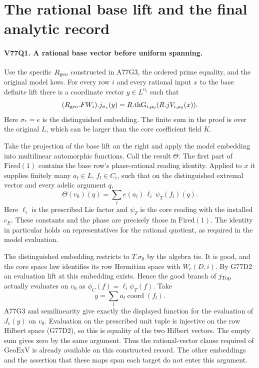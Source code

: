 \section{The rational base lift and the final analytic record}

\paragraph{V77Q1. A rational base vector before uniform spanning.}
Use the specific $R_{\rm geo}$ constructed in A77G3, the ordered
prime equality, and the original model laws. For every row $i$ and
every rational input $x$ to the base definite lift there is a
coordinate vector $y\in L^{n_i}$ such that
\[
 (R_{\rm geo}.FW_i).j_{\sigma_*}(y)
   =R.\mathrm{thG}_{i,\mu_0}(R.jV_{i,\mu_0}(x)).
\]
Here $\sigma_*=e$ is the distinguished embedding. The finite sum
in the proof is over the original $L$, which can be larger than the
core coefficient field $K$.

Take the projection of the base lift on the right and apply the
model embedding into multilinear automorphic functions. Call the
result $\Theta$. The first part of $\mathrm{Fired}(1)$ contains
the base row's phase-rational reading identity. Applied to $x$
it supplies finitely many $a_l\in L$, $f_l\in C_i$, such that
on the distinguished extremal vector and every adelic argument $q$,
\[
 \Theta(v_0)(q)=
    \sum_l e(a_l)\,\ell_i\,\psi_T(f_l)(q).
\]
Here $\ell_i$ is the prescribed Lie factor and $\psi_T$ is the
core reading with the installed $c_E$. These constants and the
phase are precisely those in $\mathrm{Fired}(1)$. The identity in particular holds on representatives for the rational
quotient, as required in the model evaluation.

The distinguished embedding restricts to $T.\sigma_0$ by the
algebra tie. It is good, and the core space law identifies its
row Hermitian space with $W_c(D,i)$. By G77D2 an evaluation lift
at this embedding exists. Hence the good branch of $j_{\rm Top}$
actually evaluates on $v_0$ as $\phi_C(f)=\ell_i\psi_T(f)$.
Take
\[
                    y=\sum_l a_l\operatorname{coord}(f_l).
\]
A77G3 and semilinearity give exactly the displayed function for
the evaluation of $J_e(y)$ on $v_0$. Evaluation on the prescribed
unit tuple is injective on the row Hilbert space (G77D2), so this
is equality of the two Hilbert vectors. The empty sum gives zero
by the same argument. Thus the rational-vector clause required
of $\mathrm{GeoExV}$ is already available on this constructed
record. The other embeddings and the assertion that these maps
span each target do not enter this argument.

